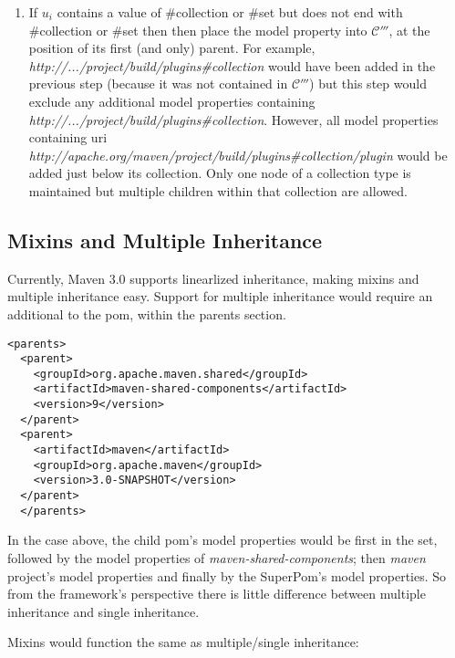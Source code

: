 \documentclass[12pt]{amsart}
\begin{document}
\begin{enumerate}
\item If \begin{math}u_{i}\end{math} contains a value of \#collection or \#set but does not end with  \#collection or \#set then  then place the model property into \begin{math}\mathcal{C'''}\end{math}, at the position of its first (and only) parent. For example,\emph{ http://.../project/build/plugins\#collection }would have been added in the previous step (because it was not contained in \begin{math}\mathcal{C'''}\end{math}) but this step would exclude any additional model properties containing \emph{http://.../project/build/plugins\#collection}.  However, all model properties containing uri \emph{http://apache.org/maven/project/build/plugins\#collection/plugin} would be added just below its collection. Only one node of a collection type is maintained but multiple children within that collection are allowed.

\end{enumerate}

\subsection{Mixins and Multiple Inheritance}
Currently, Maven 3.0 supports linearlized inheritance, making mixins and multiple inheritance easy. Support for multiple inheritance would require an additional to the pom, within the parents section.

\begin{verbatim}
<parents>
  <parent>
    <groupId>org.apache.maven.shared</groupId>
    <artifactId>maven-shared-components</artifactId>
    <version>9</version>
  </parent>
  <parent>
    <artifactId>maven</artifactId>
    <groupId>org.apache.maven</groupId>
    <version>3.0-SNAPSHOT</version>
  </parent>
  </parents>
\end{verbatim}

In the case above, the child pom's model properties would be first in the set, followed by the model properties of \emph{maven-shared-components}; then \emph{maven} project's model properties and finally by the SuperPom's model properties. So from the framework's perspective there is little difference between multiple inheritance and single inheritance.

Mixins would function the same as multiple/single inheritance:
\end{document}
